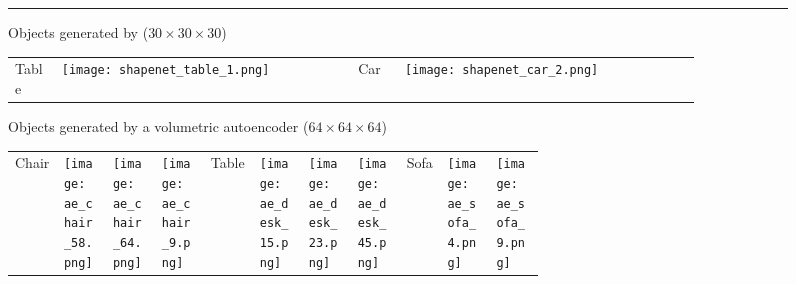 \documentclass{article}
\begin{document}
\begin{figure}[t]

\hrule
\vspace{5pt}

Objects generated by \cite{wu20153d} ($30\times30\times30$)
\begin{tabular}{L{0.06\linewidth}C{0.38\linewidth}R{0.06\linewidth}C{0.38\linewidth}}
Table&
\texttt{[image: shapenet\_table\_1.png]}&
Car&
\texttt{[image: shapenet\_car\_2.png]}\\
\end{tabular}

\vspace{3pt}
Objects generated by a volumetric autoencoder ($64\times 64\times 64$)
\vspace{3pt}

\begin{tabular}{L{0.06\linewidth}C{0.064\linewidth}C{0.064\linewidth}C{0.064\linewidth}L{0.06\linewidth}C{0.064\linewidth}C{0.064\linewidth}C{0.064\linewidth}L{0.05\linewidth}C{0.064\linewidth}C{0.064\linewidth}}
Chair &
\texttt{[image: ae\_chair\_58.png]}&
\texttt{[image: ae\_chair\_64.png]}&
\texttt{[image: ae\_chair\_9.png]}&
Table &
\texttt{[image: ae\_desk\_15.png]}&
\texttt{[image: ae\_desk\_23.png]}&
\texttt{[image: ae\_desk\_45.png]}&
Sofa &
\texttt{[image: ae\_sofa\_4.png]}&
\texttt{[image: ae\_sofa\_9.png]}
\end{tabular}
\vspace{-8pt}


\end{figure}
\end{document}
